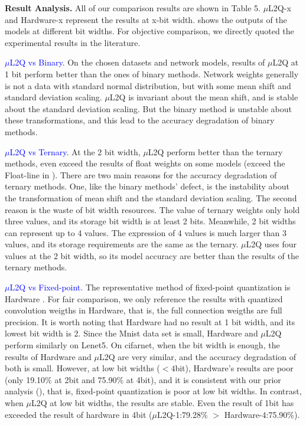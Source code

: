 \textbf{Result Analysis.} All of our comparison results are shown in Table 5. $\mu$L2Q-x and Hardware-x represent the results at x-bit width.  shows the outputs of the models at different bit widths. For objective comparison, we directly quoted the experimental results in the literature.

\textcolor{blue}{$\mu$L2Q vs Binary.} On the chosen datasets and network models, results of $\mu$L2Q at 1 bit perform better than the ones of binary methods. 
Network weights generally is not a data with standard normal distribution, but with some mean shift and standard deviation scaling. 
$\mu$L2Q is invariant about the mean shift, and is stable about the standard deviation scaling. But the binary method is unstable about these transformations, and this lead to the accuracy degradation of binary methods.

\textcolor{blue}{$\mu$L2Q vs Ternary.} At the 2 bit width, $\mu$L2Q perform better than the ternary methods, even exceed the results of float weights on some models (exceed the Float-line in ). There are two main reasons for the accuracy degradation of ternary methods. One, like the binary methods' defect, is the instability about the transformation of mean shift and the standard deviation scaling. The second reason is the waste of bit width resources. The value of ternary weights only hold three values, and its storage bit width is at least 2 bits. Meanwhile, 2 bit widths can represent up to 4 values. The expression of 4 values is much larger than 3 values, and its storage requirements are the same as the ternary. $\mu$L2Q uses four values at the 2 bit width, so its model accuracy are better than the results of the ternary methods.

\textcolor{blue}{$\mu$L2Q vs Fixed-point.} The representative method of fixed-point quantization is Hardware \citep{gysel2016hardware}. For fair comparison, we only reference the results with quantized convolution weigths in Hardware, that is, the full connection weigths are full precision. It is worth noting that Hardware had no result at 1 bit width, and its lowest bit width is 2.
Since the Mnist data set is small, Hardware and $\mu$L2Q perform similarly on Lenet5. 
On cifarnet, when the bit width is enough, the results of Hardware and $\mu$L2Q are very similar, and the accuracy degradation of both is small.
However, at low bit widths ($<4$bit), Hardware's results are poor (only 19.10\% at 2bit and 75.90\% at 4bit), and it is consistent with our prior analysis (), that is, fixed-point quantization is poor at low bit widths. In contrast, when $\mu$L2Q at low bit widths, the results are stable. Even the result of 1bit has exceeded the result of hardware in 4bit ($\mu$L2Q-1:79.28\% $>$ Hardware-4:75.90\%).

